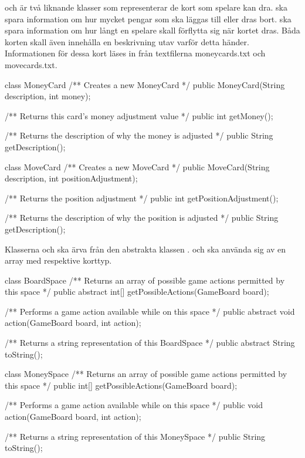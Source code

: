  och  är två liknande klasser som representerar de kort som spelare kan dra.  ska spara information om hur mycket pengar som ska läggas till eller dras bort.  ska spara information om hur långt en spelare skall förflytta sig när kortet dras. Båda korten skall även innehålla en beskrivning utav varför detta händer. Informationen för dessa kort läses in från textfilerna moneycards.txt och movecards.txt.

\begin{JavaSpec}{class MoneyCard}
    /** Creates a new MoneyCard */
    public MoneyCard(String description, int money);

    /** Returns this card's money adjustment value */
    public int getMoney();

    /** Returns the description of why the money is adjusted */
    public String getDescription();
\end{JavaSpec}

\begin{JavaSpec}{class MoveCard}
    /** Creates a new MoveCard */
    public MoveCard(String description, int positionAdjustment);

    /** Returns the position adjustment */
    public int getPositionAdjustment();

    /** Returns the description of why the position is adjusted */
    public String getDescription();

\end{JavaSpec}

Klasserna  och  ska ärva från den abstrakta klassen .  och  ska använda sig av en array med respektive korttyp.

\begin{JavaSpec}{class BoardSpace}
    /** Returns an array of possible game actions permitted by this space */
    public abstract int[] getPossibleActions(GameBoard board);

    /** Performs a game action available while on this space */
    public abstract void action(GameBoard board, int action);

    /** Returns a string representation of this BoardSpace */
    public abstract String toString();
\end{JavaSpec}

\begin{JavaSpec}{class MoneySpace}
    /** Returns an array of possible game actions permitted by this space */
    public int[] getPossibleActions(GameBoard board);

    /** Performs a game action available while on this space */
    public void action(GameBoard board, int action);

    /** Returns a string representation of this MoneySpace */
   public String toString();
\end{JavaSpec}

